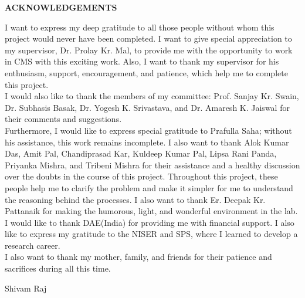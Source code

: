 \begin{center}
{\bf ACKNOWLEDGEMENTS}
\end{center}
I want to express my deep gratitude to all those people without whom this project would never have been completed. I want to give special appreciation to my supervisor, Dr. Prolay Kr. Mal, to provide me with the opportunity to work in CMS with this exciting work. Also, I want to thank my supervisor for his enthusiasm, support, encouragement, and patience, which help me to complete this project.\\
I would also like to thank the members of my committee: Prof. Sanjay Kr. Swain, Dr. Subhasis Basak, Dr. Yogesh K. Srivastava, and Dr. Amaresh K. Jaiswal for their comments and suggestions.\\
Furthermore, I would like to express special gratitude to Prafulla Saha; without his assistance, this work remains incomplete. I also want to thank Alok Kumar Das, Amit Pal, Chandiprasad Kar, Kuldeep Kumar Pal, Lipsa Rani Panda, Priyanka Mishra, and Tribeni Mishra for their assistance and a healthy discussion over the doubts in the course of this project. Throughout this project, these people help me to clarify the problem and make it simpler for me to understand the reasoning behind the processes. I also want to thank Er. Deepak Kr. Pattanaik for making the humorous, light, and wonderful environment in the lab.\\ 
I would like to thank DAE(India) for providing me with financial support. I also like to express my gratitude to the NISER and SPS, where I learned to develop a research career.\\
I also want to thank my mother, family, and friends for their patience and sacrifices during all this time.


 \begin{flushright}
 Shivam Raj 
 \end{flushright}                   


                                           

